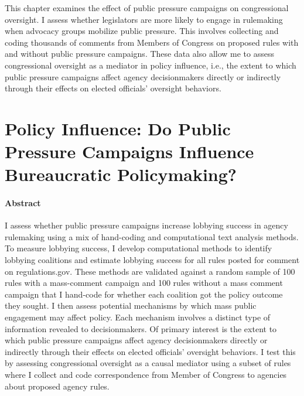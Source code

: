 \documentclass[
]{book}
\begin{document}
This chapter examines the effect of public pressure campaigns on congressional oversight. I assess whether legislators are more likely to engage in rulemaking when advocacy groups mobilize public pressure. This involves collecting and coding thousands of comments from Members of Congress on proposed rules with and without public pressure campaigns. These data also allow me to assess congressional oversight as a mediator in policy influence, i.e., the extent to which public pressure campaigns affect agency decisionmakers directly or indirectly through their effects on elected officials' oversight behaviors.

\hypertarget{policy-influence-do-public-pressure-campaigns-influence-bureaucratic-policymaking}{%
\chapter{Policy Influence: Do Public Pressure Campaigns Influence Bureaucratic Policymaking?}\label{policy-influence-do-public-pressure-campaigns-influence-bureaucratic-policymaking}}

\hypertarget{abstract-3}{%
\subsubsection*{Abstract}\label{abstract-3}}

I assess whether public pressure campaigns increase lobbying success in agency rulemaking using a mix of hand-coding and computational text analysis methods. To measure lobbying success, I develop computational methods to identify lobbying coalitions and estimate lobbying success for all rules posted for comment on regulations.gov. These methods are validated against a random sample of 100 rules with a mass-comment campaign and 100 rules without a mass comment campaign that I hand-code for whether each coalition got the policy outcome they sought. I then assess potential mechanisms by which mass public engagement may affect policy. Each mechanism involves a distinct type of information revealed to decisionmakers. Of primary interest is the extent to which public pressure campaigns affect agency decisionmakers directly or indirectly through their effects on elected officials' oversight behaviors. I test this by assessing congressional oversight as a causal mediator using a subset of rules where I collect and code correspondence from Member of Congress to agencies about proposed agency rules.
\end{document}
